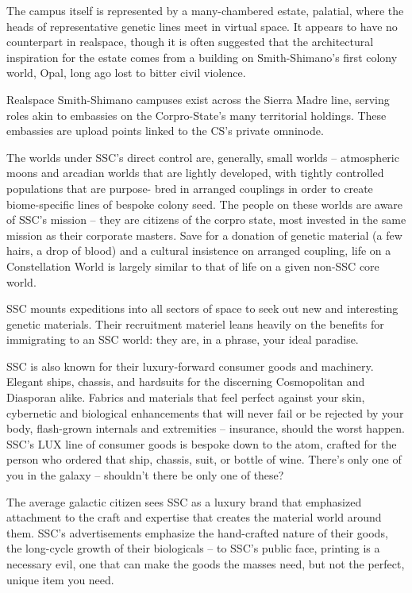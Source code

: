 The campus itself is represented by a many-chambered estate, palatial, where the heads of
representative genetic lines meet in virtual space. It appears to have no counterpart in realspace,
though it is often suggested that the architectural inspiration for the estate comes from a building
on Smith-Shimano’s first colony world, Opal, long ago lost to bitter civil violence.


Realspace Smith-Shimano campuses exist across the Sierra Madre line, serving roles akin to
embassies on the Corpro-State’s many territorial holdings. These embassies are upload points
linked to the CS’s private omninode.


The worlds under SSC’s direct control are, generally, small worlds -- atmospheric moons and
arcadian worlds that are lightly developed, with tightly controlled populations that are purpose-
bred in arranged couplings in order to create biome-specific lines of bespoke colony seed. The
people on these worlds are aware of SSC’s mission -- they are citizens of the corpro state, most
invested in the same mission as their corporate masters. Save for a donation of genetic material
(a few hairs, a drop of blood) and a cultural insistence on arranged coupling, life on a
Constellation World is largely similar to that of life on a given non-SSC core world.





SSC mounts expeditions into all sectors of space to seek out new and interesting genetic
materials. Their recruitment materiel leans heavily on the benefits for immigrating to an SSC
world: they are, in a phrase, your ideal paradise.


SSC is also known for their luxury-forward consumer goods and machinery. Elegant ships,
chassis, and hardsuits for the discerning Cosmopolitan and Diasporan alike. Fabrics and
materials that feel perfect against your skin, cybernetic and biological enhancements that will
never fail or be rejected by your body, flash-grown internals and extremities -- insurance, should
the worst happen. SSC’s LUX line of consumer goods is bespoke down to the atom, crafted for
the person who ordered that ship, chassis, suit, or bottle of wine. There’s only one of you in the
galaxy -- shouldn’t there be only one of these?


The average galactic citizen sees SSC as a luxury brand that emphasized attachment to the craft
and expertise that creates the material world around them. SSC’s advertisements emphasize the
hand-crafted nature of their goods, the long-cycle growth of their biologicals -- to SSC’s public
face, printing is a necessary evil, one that can make the goods the masses need, but not the
perfect, unique item you need.


